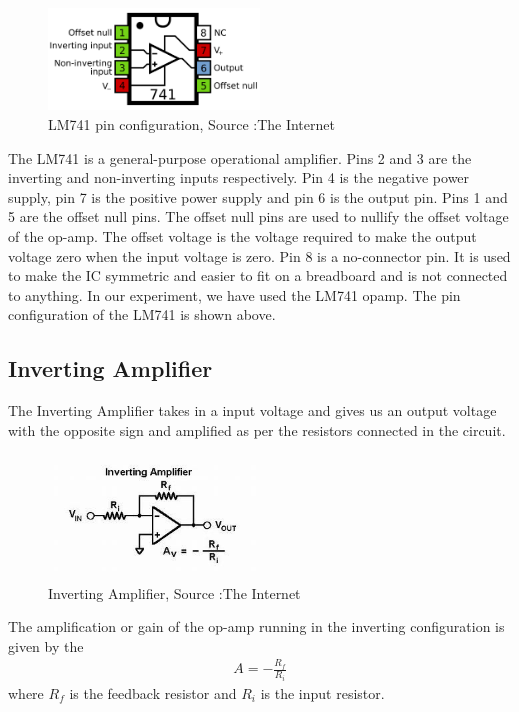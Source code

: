 \documentclass{scrartcl}
\newcommand{\1}{\mathbbm{1}}
\begin{document}
\par
\begin{figure}[H]
    \centering
    \includegraphics[width=0.5\textwidth]{LM741.png}
    \caption{LM741 pin configuration, Source :The Internet}
\end{figure}
The LM741 is a general-purpose operational amplifier.
Pins 2 and 3 are the inverting and non-inverting inputs respectively. Pin 4 is the negative power supply, pin 7 is the positive power supply and pin 6 is the output pin.
Pins 1 and 5 are the offset null pins. The offset null pins are used to nullify the offset voltage of the op-amp. The offset voltage is the voltage required to make the output voltage zero when the input voltage is zero.
Pin 8 is a no-connector pin. It is used to make the IC symmetric  and easier to fit on a breadboard and is not connected to anything.
In our experiment, we have used the LM741 opamp. The pin configuration of the LM741 is shown above.
\subsection{Inverting Amplifier}
The Inverting Amplifier takes in a input voltage and gives us an output voltage with the opposite sign and amplified as per 
the resistors connected in the circuit.
\begin{figure}[H]
    \centering
    \includegraphics[width=0.5\textwidth]{invamp.jpg}
    \caption{Inverting Amplifier, Source :The Internet}
\end{figure}
The amplification or gain of the op-amp running in the inverting configuration is given by the
\begin{align*}
    A = -\frac{R_f}{R_i}
\end{align*}
where $R_f$ is the feedback resistor and $R_i$ is the input resistor.
\end{document}
